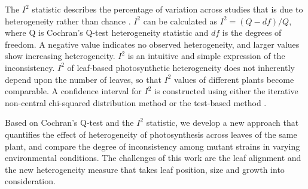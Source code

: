 \documentclass[times,11pt]{article}
\begin{document}
{%

The $I^2$ statistic describes the percentage of variation across studies that is due to heterogeneity rather than chance \cite{higgins2002quantifying,higgins2003measuring}. $I^2$ can be calculated  as $I^2 = (Q - df)/Q$, where Q is Cochran's Q-test heterogeneity statistic and $df$ is the degrees of freedom. A negative value  indicates no observed heterogeneity, and larger values show increasing heterogeneity. $I^2$ is an intuitive and simple expression of the inconsistency. $I^2$ of leaf-based photosynthetic heterogeneity does not inherently depend upon the number of leaves, so that $I^2$ values of different plants become comparable. A confidence interval for $I^2$ is constructed using either the iterative non-central chi-squared distribution method \cite{hedges2001power} or the test-based method \cite{higgins2002quantifying}.

Based on Cochran's Q-test and the $I^2$ statistic, we develop a new approach that quantifies the effect of heterogeneity of photosynthesis across leaves of the same plant, and compare the degree of inconsistency among mutant strains in varying environmental conditions. The challenges of this work are the leaf alignment and the new heterogeneity measure that takes leaf position, size and growth into consideration.


}
\end{document}
